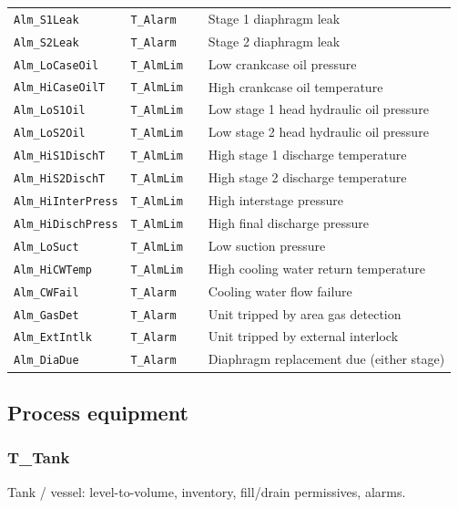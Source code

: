 {\begin{longtable}{@{}>{\raggedright\arraybackslash}p{3.4cm}>{\raggedright\arraybackslash}p{3.3cm}>{\raggedright\arraybackslash}p{1.3cm}>{\raggedright\arraybackslash}p{6.4cm}@{}}
\texttt{Alm\_S1Leak} & \texttt{T\_Alarm} &  & Stage 1 diaphragm leak \\
\texttt{Alm\_S2Leak} & \texttt{T\_Alarm} &  & Stage 2 diaphragm leak \\
\texttt{Alm\_LoCaseOil} & \texttt{T\_AlmLim} &  & Low crankcase oil pressure \\
\texttt{Alm\_HiCaseOilT} & \texttt{T\_AlmLim} &  & High crankcase oil temperature \\
\texttt{Alm\_LoS1Oil} & \texttt{T\_AlmLim} &  & Low stage 1 head hydraulic oil pressure \\
\texttt{Alm\_LoS2Oil} & \texttt{T\_AlmLim} &  & Low stage 2 head hydraulic oil pressure \\
\texttt{Alm\_HiS1DischT} & \texttt{T\_AlmLim} &  & High stage 1 discharge temperature \\
\texttt{Alm\_HiS2DischT} & \texttt{T\_AlmLim} &  & High stage 2 discharge temperature \\
\texttt{Alm\_HiInterPress} & \texttt{T\_AlmLim} &  & High interstage pressure \\
\texttt{Alm\_HiDischPress} & \texttt{T\_AlmLim} &  & High final discharge pressure \\
\texttt{Alm\_LoSuct} & \texttt{T\_AlmLim} &  & Low suction pressure \\
\texttt{Alm\_HiCWTemp} & \texttt{T\_AlmLim} &  & High cooling water return temperature \\
\texttt{Alm\_CWFail} & \texttt{T\_Alarm} &  & Cooling water flow failure \\
\texttt{Alm\_GasDet} & \texttt{T\_Alarm} &  & Unit tripped by area gas detection \\
\texttt{Alm\_ExtIntlk} & \texttt{T\_Alarm} &  & Unit tripped by external interlock \\
\texttt{Alm\_DiaDue} & \texttt{T\_Alarm} &  & Diaphragm replacement due (either stage) \\
\bottomrule
\end{longtable}
}
\subsection{Process equipment}
\subsubsection*{T\_Tank}
\label{app:pclib:ttank}
Tank /\allowbreak{} vessel: level-to-volume, inventory, fill/\allowbreak{}drain permissives, alarms.

